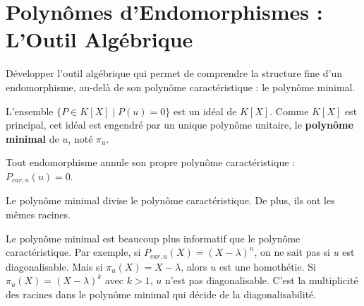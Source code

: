 \section{Polynômes d'Endomorphismes : L'Outil Algébrique}

\begin{objectif}
    Développer l'outil algébrique qui permet de comprendre la structure fine d'un endomorphisme, au-delà de son polynôme caractéristique : le polynôme minimal.
\end{objectif}

\begin{definition}
    L'ensemble $\{P \in K[X] \mid P(u)=0\}$ est un idéal de $K[X]$. Comme $K[X]$ est principal, cet idéal est engendré par un unique polynôme unitaire, le \textbf{polynôme minimal} de $u$, noté $\pi_u$.
\end{definition}

\begin{theorem}
    Tout endomorphisme annule son propre polynôme caractéristique : $P_{car,u}(u) = 0$.
\end{theorem}

\begin{corollary}
    Le polynôme minimal divise le polynôme caractéristique. De plus, ils ont les mêmes racines.
\end{corollary}

\begin{remark}
    Le polynôme minimal est beaucoup plus informatif que le polynôme caractéristique.
    Par exemple, si $P_{car,u}(X) = (X-\lambda)^n$, on ne sait pas si $u$ est diagonalisable. Mais si $\pi_u(X) = X-\lambda$, alors $u$ est une homothétie. Si $\pi_u(X) = (X-\lambda)^k$ avec $k>1$, $u$ n'est pas diagonalisable. C'est la multiplicité des racines dans le polynôme minimal qui décide de la diagonalisabilité.
\end{remark}